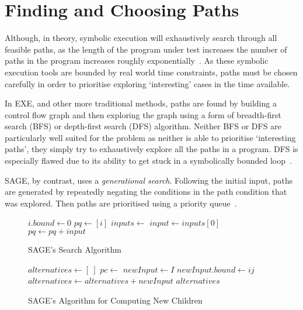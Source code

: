 \documentclass[]{final_report}
\begin{document}
\section{Finding and Choosing Paths}

Although, in theory, symbolic execution will exhaustively search through all feasible paths, as the length of the program under test increases the number of paths in the program increases roughly exponentially~\cite{cadar2013symbolic}. As these symbolic execution tools are bounded by real world time constraints, paths must be chosen carefully in order to prioritise exploring `interesting' cases in the time available.

In EXE, and other more traditional methods, paths are found by building a control flow graph and then exploring the graph using a form of breadth-first search (BFS) or depth-first search (DFS) algorithm. Neither BFS or DFS are particularly well suited for the problem as neither is able to prioritise `interesting paths', they simply try to exhaustively explore all the paths in a program. DFS is especially flawed due to its ability to get stuck in a symbolically bounded loop~\cite{cadar2008exe}. 

SAGE, by contrast, uses a \textit{generational search}. Following the initial input, paths are generated by repeatedly negating the conditions in the path condition that was explored. Then paths are prioritised using a priority queue~\cite{godefroid2005dart}.

\begin{figure}[t]
\begin{algorithmic}
	\State $i.bound \gets 0$
	\State $pq \gets [i]$
	\State{}
		\State $inputs \gets$ 
			\State $input \gets inputs[0]$
			\State $pq \gets pq + input$
		\EndWhile
	\EndWhile
\EndFunction    
\end{algorithmic}
\caption{\label{fig:sage-search} SAGE's Search Algorithm}
\end{figure}

\begin{figure}[t]
\begin{algorithmic}
	\State $alternatives \gets [\ ]$
	\State $pc \gets$ 
			\State $newInput \gets I$
			\State $newInput.bound \gets ij$
			\State $alternatives \gets alternatives + newInput$
		\EndIf
	\EndFor
	\State \Return $alternatives$
\EndFunction    
\end{algorithmic}
\caption{\label{fig:sage-compute-new-children} SAGE's Algorithm for Computing New Children}
\end{figure}
\end{document}
